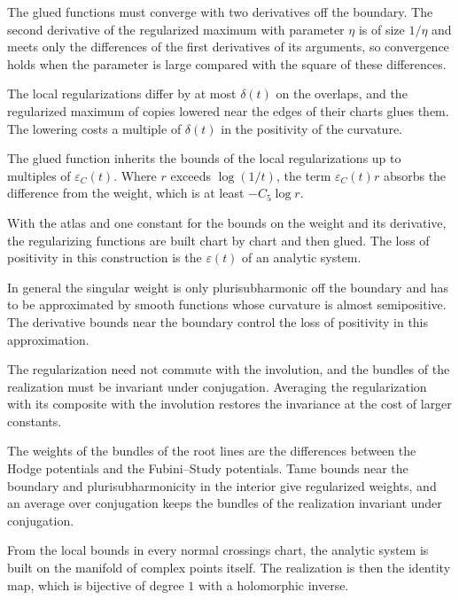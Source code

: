The glued functions must converge with two derivatives off the boundary. The second derivative of the regularized
maximum with parameter $\eta$ is of size $1/\eta$ and meets only the differences of the first derivatives of its
arguments, so convergence holds when the parameter is large compared with the square of these differences.

The local regularizations differ by at most $\delta(t)$ on the overlaps, and the regularized maximum of copies lowered
near the edges of their charts glues them. The lowering costs a multiple of $\delta(t)$ in the positivity of the
curvature.

The glued function inherits the bounds of the local regularizations up to multiples of $\varepsilon_{C}(t)$. Where $r$
exceeds $\log(1/t)$, the term $\varepsilon_C(t)r$ absorbs the difference from the weight, which is at least $-C_5\log r$.

With the atlas and one constant for the bounds on the weight and its derivative, the regularizing functions are built
chart by chart and then glued. The loss of positivity in this construction is the $\varepsilon(t)$ of an analytic system.

In general the singular weight is only plurisubharmonic off the boundary and has to be approximated by smooth functions
whose curvature is almost semipositive. The derivative bounds near the boundary control the loss of positivity in this
approximation.

The regularization need not commute with the involution, and the bundles of the realization must be invariant under
conjugation. Averaging the regularization with its composite with the involution restores the invariance at the cost of
larger constants.

The weights of the bundles of the root lines are the differences between the Hodge potentials and the Fubini--Study
potentials. Tame bounds near the boundary and plurisubharmonicity in the interior give regularized weights, and an
average over conjugation keeps the bundles of the realization invariant under conjugation.

From the local bounds in every normal crossings chart, the analytic system is built on the manifold of complex
points itself. The realization is then the identity map, which is bijective of degree $1$ with a holomorphic
inverse.

